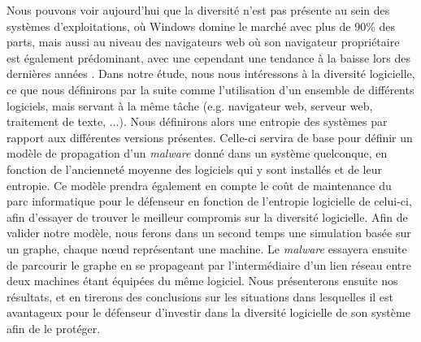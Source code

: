 Nous pouvons voir aujourd’hui que la diversité n’est pas présente au sein des systèmes d’exploitations, où Windows domine le marché avec plus de 90\% des parts, mais aussi au niveau des navigateurs web où son navigateur propriétaire est également prédominant, avec une cependant une tendance à la baisse lors des dernières années \cite{netMarketShare}. 
Dans notre étude, nous nous intéressons à la diversité logicielle, ce que nous définirons par la suite comme l'utilisation d'un ensemble de différents logiciels, mais servant à la même tâche (e.g. navigateur web, serveur web, traitement de texte, ...). Nous définirons alors une entropie des systèmes par rapport aux différentes versions présentes. Celle-ci servira de base pour définir un modèle de propagation d'un \textit{malware} donné dans un système quelconque, en fonction de l'ancienneté moyenne des logiciels qui y sont installés et de leur entropie. Ce modèle prendra également en compte le coût de maintenance du parc informatique pour le défenseur en fonction de l'entropie logicielle de celui-ci, afin d'essayer de trouver le meilleur compromis sur la diversité logicielle.
Afin de valider notre modèle, nous ferons dans un second temps une simulation basée sur un graphe, chaque nœud représentant une machine. Le \textit{malware} essayera ensuite de parcourir le graphe en se propageant par l'intermédiaire d'un lien réseau entre deux machines étant équipées du même logiciel. Nous présenterons ensuite nos résultats, et en tirerons des conclusions sur les situations dans lesquelles il est avantageux pour le défenseur d'investir dans la diversité logicielle de son système afin de le protéger.
